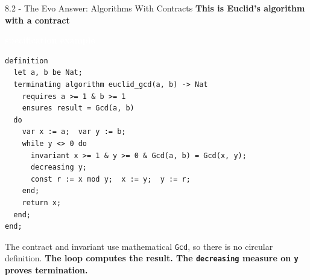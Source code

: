 \documentclass[aspectratio=169,11pt]{beamer}
\newcommand{\statusbadge}[2]{\colorbox{#1}{\textcolor{white}{\strut\scriptsize\sffamily\bfseries #2}}}
\newcommand{\badgeSpec}{\statusbadge{green!35!black}{specification example}}
\begin{document}
\begin{frame}[fragile,t]{8.2 - The Evo Answer: Algorithms With Contracts}
\smallskip
\textbf{\textcolor{blue!55!black}{\textbf{This is Euclid's algorithm with a contract}}}~\badgeSpec
\begin{lstlisting}[language={mizar},basicstyle=\ttfamily\footnotesize]
definition
  let a, b be Nat;
  terminating algorithm euclid_gcd(a, b) -> Nat
    requires a >= 1 & b >= 1
    ensures result = Gcd(a, b)
  do
    var x := a;  var y := b;
    while y <> 0 do
      invariant x >= 1 & y >= 0 & Gcd(a, b) = Gcd(x, y);
      decreasing y;
      const r := x mod y;  x := y;  y := r;
    end;
    return x;
  end;
end;
\end{lstlisting}
The contract and invariant use mathematical \texttt{Gcd}, so there is no circular definition. \textcolor{blue!55!black}{\textbf{The loop computes the result. The \texttt{decreasing} measure on \texttt{y} proves termination.}}

\end{frame}
\end{document}
